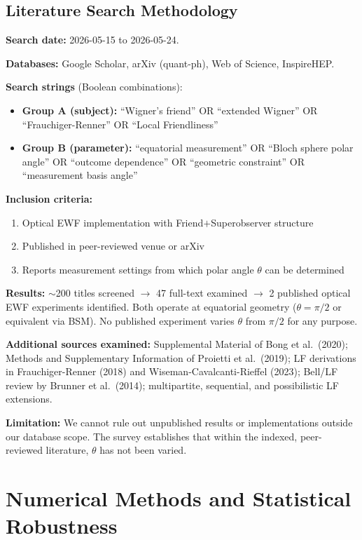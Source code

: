 \documentclass[12pt]{article}
\begin{document}
\subsection{Literature Search Methodology}

\textbf{Search date:} 2026-05-15 to 2026-05-24.

\textbf{Databases:} Google Scholar, arXiv (quant-ph), Web of Science, InspireHEP.

\textbf{Search strings} (Boolean combinations):
\begin{itemize}
\item \textbf{Group A (subject):} ``Wigner's friend'' OR ``extended Wigner'' OR ``Frauchiger-Renner'' OR ``Local Friendliness''
\item \textbf{Group B (parameter):} ``equatorial measurement'' OR ``Bloch sphere polar angle'' OR ``outcome dependence'' OR ``geometric constraint'' OR ``measurement basis angle''
\end{itemize}

\textbf{Inclusion criteria:}
\begin{enumerate}
\item Optical EWF implementation with Friend$+$Superobserver structure
\item Published in peer-reviewed venue or arXiv
\item Reports measurement settings from which polar angle $\theta$ can be determined
\end{enumerate}

\textbf{Results:} $\sim$200 titles screened $\to$ 47 full-text examined $\to$ 2 published optical EWF experiments identified. Both operate at equatorial geometry ($\theta = \pi/2$ or equivalent via BSM). No published experiment varies $\theta$ from $\pi/2$ for any purpose.

\textbf{Additional sources examined:} Supplemental Material of Bong et al.\ (2020); Methods and Supplementary Information of Proietti et al.\ (2019); LF derivations in Frauchiger-Renner (2018) and Wiseman-Cavalcanti-Rieffel (2023); Bell/LF review by Brunner et al.\ (2014); multipartite, sequential, and possibilistic LF extensions.

\textbf{Limitation:} We cannot rule out unpublished results or implementations outside our database scope. The survey establishes that within the indexed, peer-reviewed literature, $\theta$ has not been varied.

\section{Numerical Methods and Statistical Robustness}
\label{sec:S2}
\end{document}
